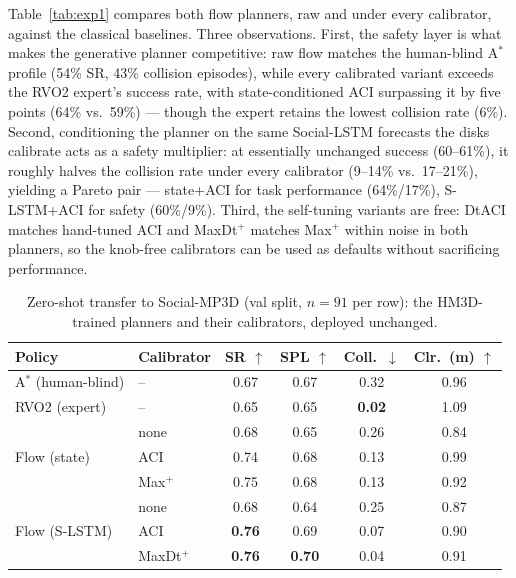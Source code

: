 
Table~\ref{tab:exp1} compares both flow planners, raw and under every
calibrator, against the classical baselines. Three observations. First, the
safety layer is what makes the generative planner competitive: raw flow
matches the human-blind A$^*$ profile (54\% SR, 43\% collision episodes),
while every calibrated variant exceeds the RVO2 expert's success rate, with
state-conditioned ACI surpassing it by five points (64\% vs.\ 59\%) --- though
the expert retains the lowest collision rate (6\%). Second, conditioning the
planner on the same Social-LSTM forecasts the disks calibrate acts as a
safety multiplier: at essentially unchanged success (60--61\%), it roughly
halves the collision rate under every calibrator (9--14\% vs.\ 17--21\%),
yielding a Pareto pair --- state+ACI for task performance (64\%/17\%),
S-LSTM+ACI for safety (60\%/9\%). Third, the self-tuning variants are free:
DtACI matches hand-tuned ACI and MaxDt$^{+}$ matches Max$^{+}$ within noise
in both planners, so the knob-free calibrators can be used as defaults
without sacrificing performance.


\begin{table}[t]
\centering
\caption{Zero-shot transfer to Social-MP3D (val split, $n{=}91$ per row):
the HM3D-trained planners and their calibrators, deployed unchanged.}
\label{tab:mp3d}
\begin{tabular}{llcccc}
\toprule
Policy & Calibrator & SR $\uparrow$ & SPL $\uparrow$ & Coll.\ $\downarrow$ & Clr.\ (m) $\uparrow$ \\
\midrule
A$^*$ (human-blind)      & --      & 0.67 & 0.67 & 0.32 & 0.96 \\
RVO2 (expert)            & --      & 0.65 & 0.65 & \textbf{0.02} & 1.09 \\
\midrule
\multirow{3}{*}{Flow (state)}
                         & none    & 0.68 & 0.65 & 0.26 & 0.84 \\
                         & ACI     & 0.74 & 0.68 & 0.13 & 0.99 \\
                         & Max$^{+}$ & 0.75 & 0.68 & 0.13 & 0.92 \\
\midrule
\multirow{3}{*}{Flow (S-LSTM)}
                         & none    & 0.68 & 0.64 & 0.25 & 0.87 \\
                         & ACI     & \textbf{0.76} & 0.69 & 0.07 & 0.90 \\
                         & MaxDt$^{+}$ & \textbf{0.76} & \textbf{0.70} & 0.04 & 0.91 \\
\bottomrule
\end{tabular}
\end{table}

